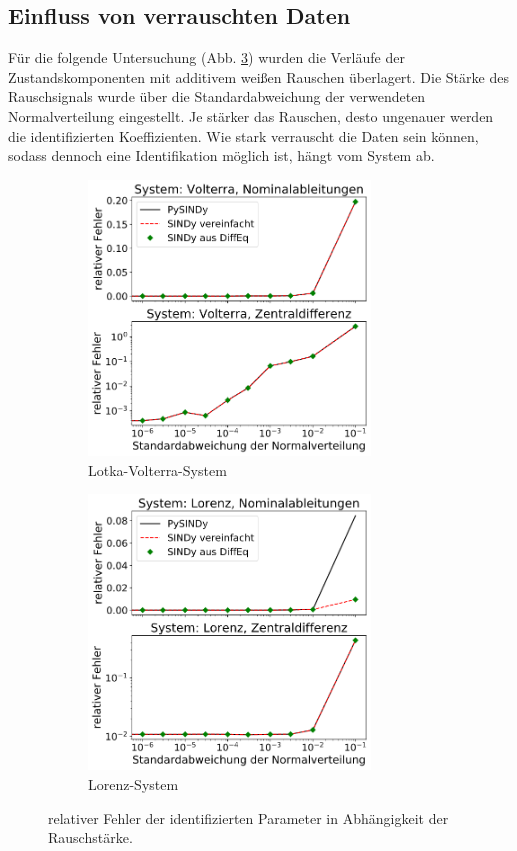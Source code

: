 \subsection{Einfluss von verrauschten Daten}
Für die folgende Untersuchung (Abb. \ref{fig:errors_noise}) wurden die Verläufe der Zustandskomponenten mit additivem weißen Rauschen überlagert. Die Stärke des Rauschsignals wurde über die Standardabweichung der verwendeten Normalverteilung eingestellt. Je stärker das Rauschen, desto ungenauer werden die identifizierten Koeffizienten. Wie stark verrauscht die Daten sein können, sodass dennoch eine Identifikation möglich ist, hängt vom System ab.
\begin{figure}[h!] %
	\centering
	\begin{subfigure}{.5\textwidth}
	  \centering
	  \includegraphics[width=75mm]{images/errors_volterra_noise_variation.png}
	  \caption{Lotka-Volterra-System}
	  \label{fig:errors_volterra_noise}
	\end{subfigure}%
	\begin{subfigure}{.5\textwidth}
	  \centering
	  \includegraphics[width=75mm]{images/errors_lorenz_noise_variation.png}
	  \caption{Lorenz-System}
	  \label{fig:errors_lorenz_noise}
	\end{subfigure}
	\caption{relativer Fehler der identifizierten Parameter in Abhängigkeit der Rauschstärke.}
	\label{fig:errors_noise}
\end{figure}

